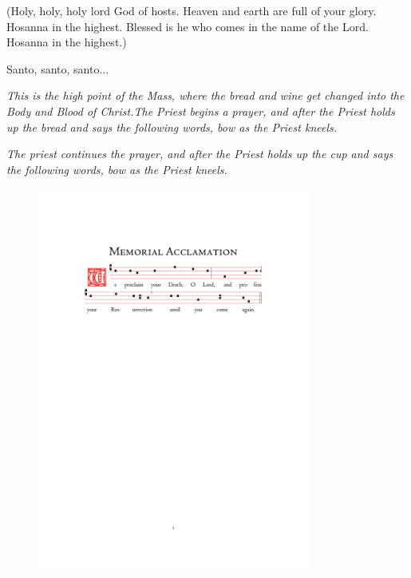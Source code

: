\documentclass[10pt,a5]{article}
\begin{document}
\begin{paracol}{2}

(Holy, holy, holy lord God of hosts.
Heaven and earth are full of your glory.
Hosanna in the highest.
Blessed is he who comes in the name of the Lord.
Hosanna in the highest.)

\switchcolumn
Santo, santo, santo...

\switchcolumn*

\medskip 
\small{\textit{This is the high point of the Mass, where the bread and wine get changed into the Body and Blood of Christ.The Priest begins a prayer, and after the Priest holds up the bread and says the following words, bow as the Priest kneels.}}


\small{\textit{The priest continues the prayer, and after the Priest holds up the cup and says the following words, bow as the Priest kneels.}}



\end{paracol}

\begin{figure}[h]
	\centering
	\includegraphics[trim = 35mm 195mm 35.5mm 45mm, clip, width = 0.8\textwidth]{scores/Memorial-Acclamation.pdf}
\end{figure}



%
\end{document}
